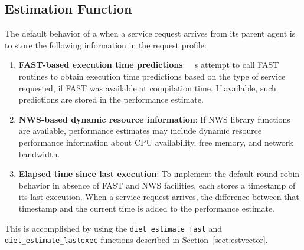 \subsection{Estimation Function}\label{sect:est_fn}

The default behavior of a {\sed} when a service request arrives from its parent
agent is to store the following information in the request profile:
\begin{enumerate}
\item \textbf{FAST-based execution time predictions}: \diet~ {\sed}s attempt to
  call FAST routines to obtain execution time predictions based on the type of
  service requested, if FAST was available at compilation time.  If available,
  such predictions are stored in the performance estimate.
\item \textbf{NWS-based dynamic resource information}: If NWS library functions
  are available, performance estimates may include dynamic resource performance
  information about CPU availability, free memory, and network bandwidth.
\item \textbf{Elapsed time since last execution}: To implement the default
  round-robin behavior in absence of FAST and NWS facilities, each {\sed}
  stores a timestamp of its last execution.  When a service request arrives,
  the difference between that timestamp and the current time is added to the
  performance estimate.
\end{enumerate}
This is accomplished by using the \texttt{diet\_estimate\_fast} and
\texttt{diet\_estimate\_lastexec} functions described in
Section~\ref{sect:estvector}.

